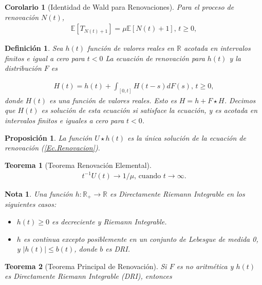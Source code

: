 \documentclass{article}
\newtheorem{Def}{Definición}[section]
\newtheorem{Teo}{Teorema}[section]
\newtheorem{Note}{Nota}[section]
\newtheorem{Prop}{Proposición}[section]
\newtheorem{Coro}{Corolario}[section]
\newcommand{\rea}{\mathbb{R}}
\newcommand{\esp}{\mathbb{E}}
\numberwithin{equation}{section}
\begin{document}
{\begin{Coro}[Identidad de Wald para Renovaciones]
Para el proceso de renovaci\'on $N\left(t\right)$,
\begin{eqnarray*}
\esp\left[T_{N\left(t\right)+1}\right]=\mu\esp\left[N\left(t\right)+1\right]\textrm{,  }t\geq0,
\end{eqnarray*}  
\end{Coro}


\begin{Def}
Sea $h\left(t\right)$ funci\'on de valores reales en $\rea$ acotada en intervalos finitos e igual a cero para $t<0$ La ecuaci\'on de renovaci\'on para $h\left(t\right)$ y la distribuci\'on $F$ es

\begin{eqnarray}%
H\left(t\right)=h\left(t\right)+\int_{\left[0,t\right]}H\left(t-s\right)dF\left(s\right)\textrm{,    }t\geq0,
\end{eqnarray}
donde $H\left(t\right)$ es una funci\'on de valores reales. Esto es $H=h+F\star H$. Decimos que $H\left(t\right)$ es soluci\'on de esta ecuaci\'on si satisface la ecuaci\'on, y es acotada en intervalos finitos e iguales a cero para $t<0$.
\end{Def}

\begin{Prop}
La funci\'on $U\star h\left(t\right)$ es la \'unica soluci\'on de la ecuaci\'on de renovaci\'on (\ref{Ec.Renovacion}).
\end{Prop}

\begin{Teo}[Teorema Renovaci\'on Elemental]
\begin{eqnarray*}
t^{-1}U\left(t\right)\rightarrow 1/\mu\textrm{,    cuando }t\rightarrow\infty.
\end{eqnarray*}
\end{Teo}


\begin{Note} Una funci\'on $h:\rea_{+}\rightarrow\rea$ es Directamente Riemann Integrable en los siguientes casos:
\begin{itemize}
\item[a)] $h\left(t\right)\geq0$ es decreciente y Riemann Integrable.
\item[b)] $h$ es continua excepto posiblemente en un conjunto de Lebesgue de medida 0, y $|h\left(t\right)|\leq b\left(t\right)$, donde $b$ es DRI.
\end{itemize}
\end{Note}

\begin{Teo}[Teorema Principal de Renovaci\'on]
Si $F$ es no aritm\'etica y $h\left(t\right)$ es Directamente Riemann Integrable (DRI), entonces


\end{Teo}}
\end{document}
